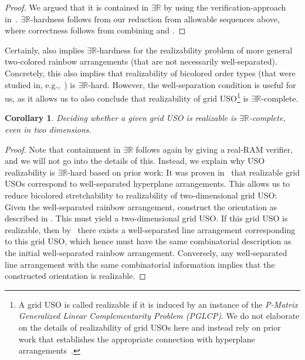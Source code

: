 \documentclass[11pt]{article}
\newtheorem{corollary}[theorem]{Corollary}
\newcommand{\ER}{\exists\mathbb{R}}
\begin{document}
\begin{proof}
    We argued that it is contained in $\ER$ by using the verification-approach in~\cite{ericksonSmoothingGapNP2024}. $\ER$-hardness follows from our reduction from allowable sequences above, where correctness follows from combining  and .
\end{proof}
%
Certainly,  also implies $\ER$-hardness for the realizability problem of more general two-colored rainbow arrangements (that are not necessarily well-separated). Concretely, this also implies that realizability of bicolored order types (that were studied in, e.g.,~\cite{aichholzerBicoloredOrderTypes2024}) is $\ER$-hard. However, the well-separation condition is useful for us, as it allows us to also conclude that realizability of grid USO\footnote{A grid USO is called realizable if it is induced by an instance of the \emph{P-Matrix Generalized Linear Complementarity Problem (PGLCP)}. We do not elaborate on the details of realizability of grid USOs here and instead rely on prior work that establishes the appropriate connection with hyperplane arrangements~\cite{borzechowskiTwoChoicesAre2024}.} is $\ER$-complete.
%
\begin{corollary}
\label{corollary:grid_uso_hard}
    Deciding whether a given grid USO is realizable is $\ER$-complete, even in two dimensions.
\end{corollary}
\begin{proof}
    Note that containment in $\ER$ follows again by giving a real-RAM verifier, and we will not go into the details of this. Instead, we explain why USO realizability is $\ER$-hard based on prior work: It was proven in~\cite{borzechowskiTwoChoicesAre2024} that realizable grid USOs correspond to well-separated hyperplane arrangements. This allows us to reduce bicolored stretchability to realizability of two-dimensional grid USO: Given the well-separated rainbow arrangement, construct the orientation as described in . This must yield a two-dimensional grid USO. If this grid USO is realizable, then by~\cite{borzechowskiTwoChoicesAre2024} there exists a well-separated line arrangement corresponding to this grid USO, which hence must have the same combinatorial description as the initial well-separated rainbow arrangement. Conversely, any well-separated line arrangement with the same combinatorial information implies that the constructed orientation is realizable. 
\end{proof}
%
%
%
%
\appendix
%
\end{document}
